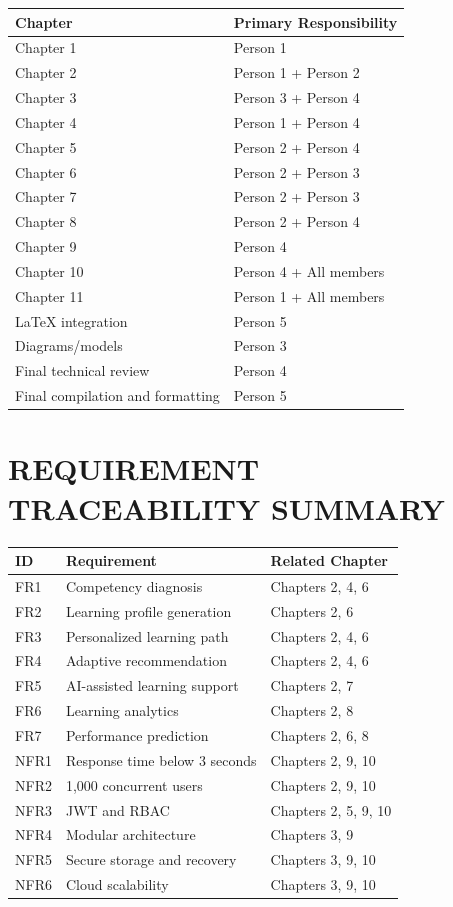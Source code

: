 \documentclass[12pt,a4paper]{report}
\begin{document}
\begin{longtable}{p{}p{}}
\toprule
\textbf{Chapter} & \textbf{Primary Responsibility}\\
\midrule
Chapter 1 & Person 1\\
Chapter 2 & Person 1 + Person 2\\
Chapter 3 & Person 3 + Person 4\\
Chapter 4 & Person 1 + Person 4\\
Chapter 5 & Person 2 + Person 4\\
Chapter 6 & Person 2 + Person 3\\
Chapter 7 & Person 2 + Person 3\\
Chapter 8 & Person 2 + Person 4\\
Chapter 9 & Person 4\\
Chapter 10 & Person 4 + All members\\
Chapter 11 & Person 1 + All members\\
LaTeX integration & Person 5\\
Diagrams/models & Person 3\\
Final technical review & Person 4\\
Final compilation and formatting & Person 5\\
\bottomrule
\end{longtable}

\appendix

\chapter{REQUIREMENT TRACEABILITY SUMMARY}

\begin{longtable}{p{}p{}p{}}
\toprule
\textbf{ID} & \textbf{Requirement} & \textbf{Related Chapter}\\
\midrule
FR1 & Competency diagnosis & Chapters 2, 4, 6\\
FR2 & Learning profile generation & Chapters 2, 6\\
FR3 & Personalized learning path & Chapters 2, 4, 6\\
FR4 & Adaptive recommendation & Chapters 2, 4, 6\\
FR5 & AI-assisted learning support & Chapters 2, 7\\
FR6 & Learning analytics & Chapters 2, 8\\
FR7 & Performance prediction & Chapters 2, 6, 8\\
NFR1 & Response time below 3 seconds & Chapters 2, 9, 10\\
NFR2 & 1,000 concurrent users & Chapters 2, 9, 10\\
NFR3 & JWT and RBAC & Chapters 2, 5, 9, 10\\
NFR4 & Modular architecture & Chapters 3, 9\\
NFR5 & Secure storage and recovery & Chapters 3, 9, 10\\
NFR6 & Cloud scalability & Chapters 3, 9, 10\\
\bottomrule
\end{longtable}
\end{document}
